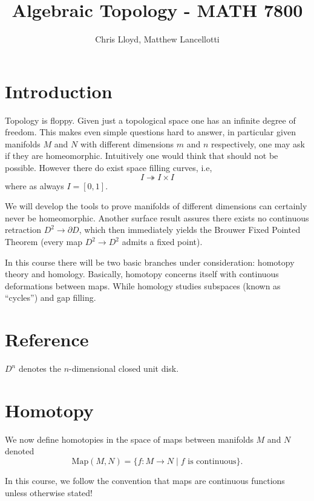 \documentclass[11pt,leqno,oneside]{amsart}
\title[Algebraic Topology]{Algebraic Topology - MATH 7800}
\author{Chris Lloyd, Matthew Lancellotti}
\date{}
\newenvironment{dateenv}{
  \vspace{1em}
}{
  \vspace{1em}
}
\newcommand{\mydate}[4]{
  \newdate{#1}{#2}{#3}{#4}
  \begin{dateenv}
    \hfill\displaydate{#1}
  \end{dateenv}
}
\numberwithin{thm}{section}
\renewcommand{\d}{\partial}
\newcommand{\Map}{\text{Map}}
\begin{document}
\maketitle \newpage

\mydate{d1}{18}{1}{2017}

\section{Introduction}

Topology is floppy. Given just a topological space one has an infinite
degree of freedom. This makes even simple questions hard to answer, in
particular given manifolds \(M\) and \(N\) with different dimensions
\(m\) and \(n\) respectively, one may ask if they are
homeomorphic. Intuitively one would think that should not be
possible. However there do exist space filling curves, i.e,
\[I \twoheadrightarrow I \times I\]
where as always \(I=[0,1]\).

We will develop the tools to prove manifolds of different dimensions can
certainly never be homeomorphic. Another surface result assures there exists no continuous
retraction \(D^2 \to \d D\), which then immediately yields the
Brouwer Fixed Pointed Theorem (every map \(D^2 \to D^2\) admits a
fixed point).

In this course there will be two basic branches under consideration:
homotopy theory and homology. Basically, homotopy concerns itself with
continuous deformations between maps. While homology studies subspaces
(known as ``cycles'') and gap filling.

\section{Reference}

\begin{defn}
  $D^n$ denotes the $n$-dimensional closed unit disk.
\end{defn}

\section{Homotopy}

We now define homotopies in the space of maps between manifolds \(M\) and
\(N\) denoted
\[\Map(M,N)=\{f \colon M \to N \mid \text{$f$ is continuous}\}.\]

In this course, we follow the convention that maps are continuous functions unless otherwise stated!
\end{document}
